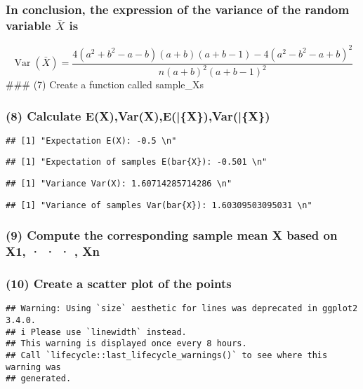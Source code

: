 \documentclass[
]{article}
\begin{document}
\subsubsection{\texorpdfstring{In conclusion, the expression of the
variance of the random variable \(\bar{X}\)
is}{In conclusion, the expression of the variance of the random variable \textbackslash bar\{X\} is}}\label{in-conclusion-the-expression-of-the-variance-of-the-random-variable-barx-is}

\[
\operatorname{Var}(\bar{X})=\frac{4\left(a^{2}+b^{2}-a-b\right)(a+b)(a+b-1)-4\left(a^{2}-b^{2}-a+b\right)^{2}}{n(a+b)^{2}(a+b-1)^{2}}
\] \#\#\# (7) Create a function called sample\_Xs

\subsubsection{\texorpdfstring{(8) Calculate
E(X),Var(X),E(\bar\{X\}),Var(\bar\{X\})}{(8) Calculate E(X),Var(X),E(\{X\}),Var(\{X\})}}\label{calculate-exvarxexvarx}

\begin{verbatim}
## [1] "Expectation E(X): -0.5 \n"
\end{verbatim}

\begin{verbatim}
## [1] "Expectation of samples E(bar{X}): -0.501 \n"
\end{verbatim}

\begin{verbatim}
## [1] "Variance Var(X): 1.60714285714286 \n"
\end{verbatim}

\begin{verbatim}
## [1] "Variance of samples Var(bar{X}): 1.60309503095031 \n"
\end{verbatim}

\subsubsection{(9) Compute the corresponding sample mean X based on X1,
· · · ,
Xn}\label{compute-the-corresponding-sample-mean-x-based-on-x1-xn}

\subsubsection{(10) Create a scatter plot of the
points}\label{create-a-scatter-plot-of-the-points}

\begin{verbatim}
## Warning: Using `size` aesthetic for lines was deprecated in ggplot2 3.4.0.
## i Please use `linewidth` instead.
## This warning is displayed once every 8 hours.
## Call `lifecycle::last_lifecycle_warnings()` to see where this warning was
## generated.
\end{verbatim}
\end{document}
